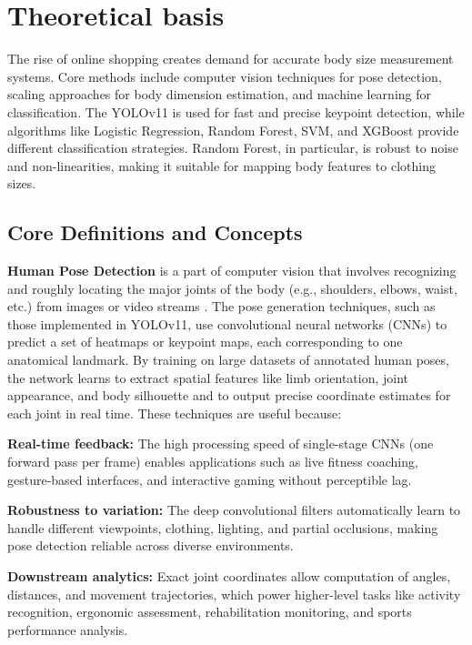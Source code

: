 \documentclass{llncs}
\begin{document}
\section{Theoretical basis}

The rise of online shopping creates demand for accurate body size measurement systems. 
Core methods include computer vision techniques for pose detection, scaling approaches for body dimension estimation, and machine learning for classification. 
The YOLOv11 is used for fast and precise keypoint detection, while algorithms like Logistic Regression, Random Forest, SVM, and XGBoost provide different classification strategies. 
Random Forest, in particular, is robust to noise and non-linearities, making it suitable for mapping body features to clothing sizes.


\subsection{Core Definitions and Concepts}

\textbf{Human Pose Detection} is a part of computer vision that involves recognizing and roughly locating the major joints of the body (e.g., shoulders, elbows, waist, etc.) from images or video streams \cite{ref24}. 
The pose generation techniques, such as those implemented in YOLOv11, use convolutional neural networks (CNNs) \cite{ref25} to predict a set of heatmaps or keypoint maps, each corresponding to one anatomical landmark. 
By training on large datasets of annotated human poses, the network learns to extract spatial features like limb orientation, joint appearance, 
    and body silhouette and to output precise coordinate estimates for each joint in real time. These techniques are useful because:

\medskip

\textbf{Real-time feedback:} The high processing speed of single-stage CNNs (one forward pass per frame) enables applications such as live fitness coaching, gesture-based interfaces, and interactive gaming without perceptible lag.

\medskip

\textbf{Robustness to variation:} The deep convolutional filters automatically learn to handle different viewpoints, clothing, lighting, and partial occlusions, making pose detection reliable across diverse environments.

\medskip

\textbf{Downstream analytics:} Exact joint coordinates allow computation of angles, distances, and movement trajectories, which power higher-level tasks like activity recognition, ergonomic assessment, rehabilitation monitoring, and sports performance analysis.
\end{document}
